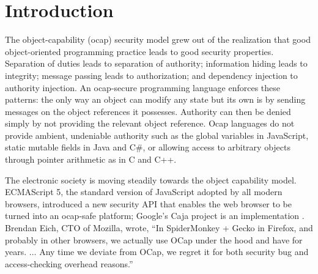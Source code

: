\documentclass[submission,copyright,creativecommons]{eptcs}
\numberwithin{equation}{subsection}
\newenvironment{toc}
{
\begin{list}{}{
   \setlength{\leftmargin}{0.4in}
   \setlength{\rightmargin}{0.6in}
   \setlength{\parskip}{0pt}
 } \item }
{\end{list}}
\begin{document}


\section{Introduction}

The object-capability (ocap) security model grew out of the realization
that good object-oriented programming practice leads to good security properties.
Separation of duties leads to separation of authority; information hiding
leads to integrity; message passing leads to authorization; 
and dependency injection to authority injection.  An
ocap-secure programming language enforces these patterns: the only way an
object can modify any state but its own is by sending messages on the object
references it possesses.  Authority can then be denied simply by not providing
the relevant object reference. Ocap languages do not provide ambient, undeniable 
authority such as the global variables in JavaScript,
static mutable fields in Java and C\#, or allowing access to arbitrary objects
through pointer arithmetic as in C and C++.

The electronic society is moving steadily towards the object
capability model.  ECMAScript 5, the standard version of JavaScript
adopted by all modern browsers, introduced a new security API that
enables the web browser to be turned into an ocap-safe platform;
Google's Caja project is an implementation \cite{Caja:2013}.  Brendan
Eich, CTO of Mozilla, wrote, ``In SpiderMonkey + Gecko in Firefox, and
probably in other browsers, we actually use OCap under the hood and
have for years. $\ldots$ Any time we deviate from OCap, we regret it for both
security bug and access-checking overhead reasons.''  \cite{Eich:2013}
\end{document}
